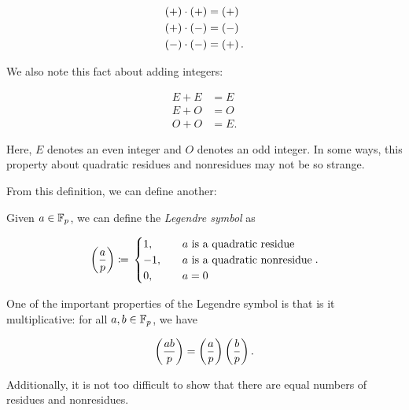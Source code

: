\begin{align}
    \left( + \right)\cdot\left( + \right) &= \left( + \right) \nonumber\\
    \left( + \right)\cdot\left( - \right) &= \left( - \right) \nonumber\\
    \left( - \right)\cdot\left( - \right) &= \left( + \right).
\end{align}

\noindent
We also note this fact about adding integers:

\begin{align}
    E + E &= E \nonumber\\
    E + O &= O \nonumber\\
    O + O &= E.
\end{align}

\noindent
Here, $E$ denotes an even integer and $O$ denotes an odd integer.
In some ways, this property about quadratic residues and nonresidues
may not be so strange.

From this definition, we can define another:

\begin{defn}
Given $a\in\mathbb{F}_{p}$, we can define the \emph{Legendre symbol} as

\begin{equation}
    \left( \frac{a}{p} \right) \coloneqq{} \begin{cases}
        1, &\quad \text{$a$ is a quadratic residue} \\
        -1, &\quad \text{$a$ is a quadratic nonresidue} \\
        0, &\quad \text{$a=0$} \\
    \end{cases}.
\end{equation}
\end{defn}

One of the important properties of the Legendre symbol
is that is it multiplicative:
for all $a,b\in\mathbb{F}_{p}$, we have

\begin{equation}
    \left( \frac{ab}{p} \right) = 
    \left( \frac{a}{p} \right)
    \left( \frac{b}{p} \right).
\end{equation}

\noindent
Additionally, it is not too difficult to show that
there are equal numbers of residues and nonresidues.


